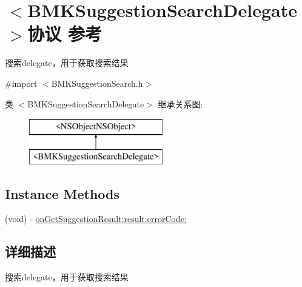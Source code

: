\hypertarget{protocol_b_m_k_suggestion_search_delegate-p}{\section{$<$B\+M\+K\+Suggestion\+Search\+Delegate$>$协议 参考}
\label{protocol_b_m_k_suggestion_search_delegate-p}
}


搜索delegate，用于获取搜索结果  




{\ttfamily \#import $<$B\+M\+K\+Suggestion\+Search.\+h$>$}

类 $<$B\+M\+K\+Suggestion\+Search\+Delegate$>$ 继承关系图\+:\begin{figure}[H]
\begin{center}
\leavevmode
\includegraphics[height=2.000000cm]{protocol_b_m_k_suggestion_search_delegate-p}
\end{center}
\end{figure}
\subsection*{Instance Methods}
\begin{DoxyCompactItemize}
\item 
(void) -\/ \hyperlink{protocol_b_m_k_suggestion_search_delegate-p_ac775c91f8fa313629246bbeafcf98eba}{on\+Get\+Suggestion\+Result\+:result\+:error\+Code\+:}
\end{DoxyCompactItemize}


\subsection{详细描述}
搜索delegate，用于获取搜索结果 

